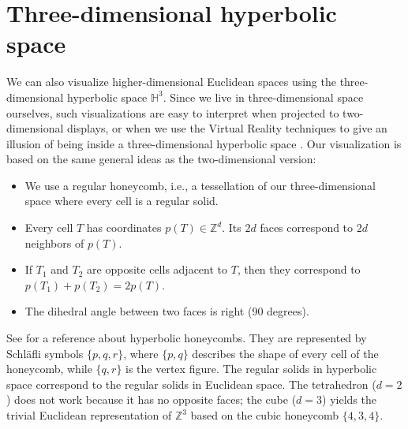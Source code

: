 \documentclass{article}
\begin{document}
\section{Three-dimensional hyperbolic space}
We can also visualize higher-dimensional Euclidean spaces using the three-dimensional hyperbolic space $\mathbb{H}^3$. 
Since we live in three-dimensional space ourselves, such visualizations are easy to interpret when projected to
two-dimensional displays, or when we use the Virtual Reality techniques to give an illusion of being inside a three-dimensional
hyperbolic space \cite{hyperbolicvr}. Our visualization is based on the same general ideas as the two-dimensional version:

\begin{itemize}
\item We use a regular honeycomb, i.e., a tessellation of our three-dimensional space where every cell is a regular solid.
\item Every cell $T$ has coordinates $p(T) \in \mathbb{Z}^d$. Its $2d$ faces correspond to $2d$ neighbors of $p(T)$.
\item If $T_1$ and $T_2$ are opposite cells adjacent to $T$, then they correspond to $p(T_1) + p(T_2) = 2p(T)$.
\item The dihedral angle between two faces is right (90 degrees).
\end{itemize}

See \cite{hhoney} for a reference about hyperbolic honeycombs. They are represented by Schl\"afli symbols $\{p,q,r\}$, where $\{p,q\}$
describes the shape of every cell of the honeycomb, while $\{q,r\}$ is the vertex figure. The regular solids in hyperbolic space
correspond to the regular solids in Euclidean space. The tetrahedron ($d=2$) does not work because it has no opposite faces;
the cube ($d=3$) yields the trivial Euclidean representation of $\mathbb{Z}^3$ based on the cubic honeycomb $\{4,3,4\}$.
\end{document}
